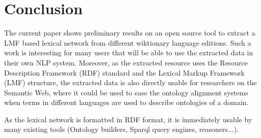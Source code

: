 \documentclass[10pt, a4paper]{article}
\begin{document}
%
%
%
%
%



\section{Conclusion}

The current paper shows preliminary results on an open source tool to extract a LMF based lexical network from different wiktionary language editions. Such a work is interesting for many users that will be able to use the extracted data in their own NLP system. Moreover, as the extracted resource uses the Resource Description Framework (RDF) standard and the Lexical Markup Framework (LMF) structure, the extracted data is also directly usable for researchers on the Semantic Web, where it could be used to ease the ontology alignment systems when terms in different languages are used to describe ontologies of a domain.

As the lexical network is formatted in RDF format, it is immediately usable by many existing tools (Ontology builders, Sparql query engines, reasoners...).
\end{document}
